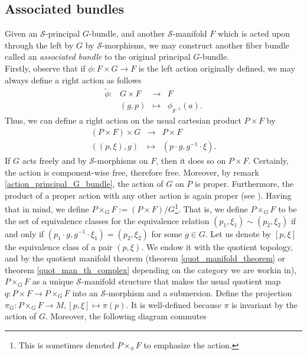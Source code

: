 \subsection{Associated bundles} \label{section_associated_bundles}
Given an \(\mathcal{S}\)-principal \(G\)-bundle, and another \(\mathcal{S}\)-manifold \(F\) which is acted upon through the left by \(G\) by \(\mathcal{S}\)-morphisms, we may construct another fiber bundle called an \textit{associated bundle} to the original principal \(G\)-bundle.  \\

Firstly, observe that if \(\phi\colon F \times G \to F\) is the left action originally defined, we may always define a right action as follows
\begin{equation} \label{eq_nueva_accion}
\begin{array}{cccc}
    \tilde{\phi}\colon& G\times F & \longrightarrow & F\\
    & (g,p) & \mapsto & \phi_{g^{-1}}(a).
\end{array}
\end{equation}
Thus, we can define a right action on the usual cartesian product \(P \times F\) by
\[
\begin{array}{ccc}
    (P\times F) \times G & \longrightarrow & P \times F \\
    ((p,\xi), g) & \mapsto & (p\cdot g, g^{-1}\cdot \xi).
\end{array}
\]
If \(G\) acts freely and by \(\mathcal{S}\)-morphisms on \(F\), then it does so on \(P \times F\). Certainly, the action is component-wise free, therefore free. Moreover, by remark \ref{action_principal_G_bundle}, the action of \(G\) on \(P\) is proper. Furthermore, the product of a proper action with any other action is again proper (see \parencite[Remark 6.3.9]{rudolph2012differential}). Having that in mind, we define \(P\times_G F:=(P\times F)/G\)\footnote{This is sometimes denoted \(P \times_\phi F\) to emphasize the action.}. That is, we define \(P\times_GF\) to be the set of equivalence classes for the equivalence relation \((p_1, \xi_1) \sim (p_2, \xi_2)\) if and only if \((p_1 \cdot g, g^{-1}\cdot \xi_1)=(p_2, \xi_2)\) for some \(g \in G\). Let us denote by \([p, \xi]\) the equivalence class of a pair \((p, \xi)\). We endow it with the quotient topology, and by the quotient manifold theorem (theorem \ref{quot_manifold_theorem} or theorem \ref{quot_man_th_complex} depending on the category we are workin in), \(P \times_G F\) as a unique \(\mathcal{S}\)-manifold structure that makes the usual quotient map \(q\colon P\times F \to P\times_GF\) into an \(\mathcal{S}\)-morphism and a submersion. Define the projection \(\pi_G\colon P \times_GF \to M, [p, \xi] \mapsto \pi(p)\). It is well-defined because \(\pi\) is invariant by the action of \(G\). Moreover, the following diagram commutes
